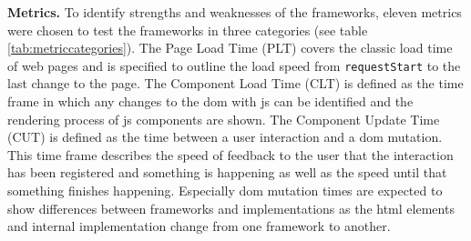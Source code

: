 \documentclass[a4paper, 12pt]{article}
\begin{document}
\textbf{Metrics.} To identify strengths and weaknesses of the frameworks, eleven metrics were chosen to test the frameworks in three categories (see table \ref{tab:metriccategories}).
The Page Load Time (PLT) covers the classic load time of web pages and is specified to outline the load speed from \verb|requestStart| to the last change to the page.
The Component Load Time (CLT) is defined as the time frame in which any changes to the \acrshort{dom} with \acrshort{js} can be identified and the rendering process of \acrshort{js} components are shown.
The Component Update Time (CUT) is defined as the time between a user interaction and a \acrshort{dom} mutation.
This time frame describes the speed of feedback to the user that the interaction has been registered and something is happening as well as the speed until that something finishes happening.
Especially \acrshort{dom} mutation times are expected to show differences between frameworks and implementations as the \acrshort{html} elements and internal implementation change from one framework to another.
\end{document}
